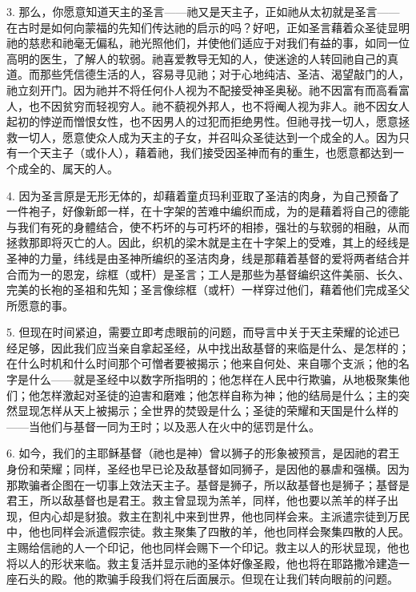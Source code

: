 3. 那么，你愿意知道天主的圣言——祂又是天主子，正如祂从太初就是圣言——在古时是如何向蒙福的先知们传达祂的启示的吗？好吧，正如圣言藉着众圣徒显明祂的慈悲和祂毫无偏私，祂光照他们，并使他们适应于对我们有益的事，如同一位高明的医生，了解人的软弱。祂喜爱教导无知的人，使迷途的人转回祂自己的真道。而那些凭信德生活的人，容易寻见祂；对于心地纯洁、圣洁、渴望敲门的人，祂立刻开门。因为祂并不将任何仆人视为不配接受神圣奥秘。祂不因富有而高看富人，也不因贫穷而轻视穷人。祂不藐视外邦人，也不将阉人视为非人。祂不因女人起初的悖逆而憎恨女性，也不因男人的过犯而拒绝男性。但祂寻找一切人，愿意拯救一切人，愿意使众人成为天主的子女，并召叫众圣徒达到一个成全的人。因为只有一个天主子（或仆人），藉着祂，我们接受因圣神而有的重生，也愿意都达到一个成全的、属天的人。\par

4. 因为圣言原是无形无体的，却藉着童贞玛利亚取了圣洁的肉身，为自己预备了一件袍子，好像新郎一样，在十字架的苦难中编织而成，为的是藉着将自己的德能与我们有死的身體结合，使不朽坏的与可朽坏的相掺，强壮的与软弱的相融，从而拯救那即将灭亡的人。因此，织机的梁木就是主在十字架上的受难，其上的经线是圣神的力量，纬线是由圣神所编织的圣洁肉身，线是那藉着基督的爱将两者结合并合而为一的恩宠，综框（或杆）是圣言；工人是那些为基督编织这件美丽、长久、完美的长袍的圣祖和先知；圣言像综框（或杆）一样穿过他们，藉着他们完成圣父所愿意的事。\par

5. 但现在时间紧迫，需要立即考虑眼前的问题，而导言中关于天主荣耀的论述已经足够，因此我们应当亲自拿起圣经，从中找出敌基督的来临是什么、是怎样的；在什么时机和什么时间那个可憎者要被揭示；他来自何处、来自哪个支派；他的名字是什么——就是圣经中以数字所指明的；他怎样在人民中行欺骗，从地极聚集他们；他怎样激起对圣徒的迫害和磨难；他怎样自称为神；他的结局是什么；主的突然显现怎样从天上被揭示；全世界的焚毁是什么；圣徒的荣耀和天国是什么样的——当他们与基督一同为王时；以及恶人在火中的惩罚是什么。\par

6. 如今，我们的主耶稣基督（祂也是神）曾以狮子的形象被预言，是因祂的君王身份和荣耀；同样，圣经也早已论及敌基督如同狮子，是因他的暴虐和强横。因为那欺骗者企图在一切事上效法天主子。基督是狮子，所以敌基督也是狮子；基督是君王，所以敌基督也是君王。救主曾显现为羔羊，同样，他也要以羔羊的样子出现，但内心却是豺狼。救主在割礼中来到世界，他也同样会来。主派遣宗徒到万民中，他也同样会派遣假宗徒。救主聚集了四散的羊，他也同样会聚集四散的人民。主赐给信祂的人一个印记，他也同样会赐下一个印记。救主以人的形状显现，他也将以人的形状来临。救主复活并显示祂的圣体好像圣殿，他也将在耶路撒冷建造一座石头的殿。他的欺骗手段我们将在后面展示。但现在让我们转向眼前的问题。\par

